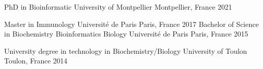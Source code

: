 
\begin{cvhonors}
  \cvhonor
    {PhD in Bioinformatic} %
    {University of Montpellier} %
    {Montpellier, France} %
    {2021} %

  \cvhonor
    {Master in Immunology} %
    {Université de Paris} %
    {Paris, France} %
    {2017} %
  \cvhonor
    {Bachelor of Science in Biochemistry Bioinformatics Biology} %
    {Université de Paris} %
    {Paris, France} %
    {2015} %

  \cvhonor
    {University degree in technology in Biochemistry/Biology} %
    {University of Toulon} %
    {Toulon, France} %
    {2014} %

\end{cvhonors}
